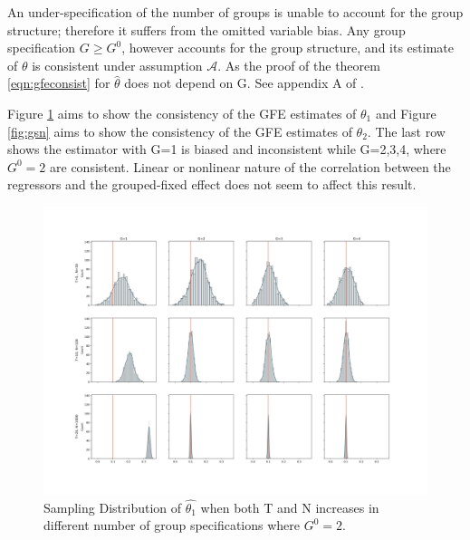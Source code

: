 An under-specification of the number of groups is unable to account for the group structure; therefore it suffers from the omitted variable bias. Any group specification $G \geq G^0$, however accounts for the group structure, and its estimate of $\theta$ is consistent under assumption $\mathcal{A}$. As the proof of the theorem \ref{eqn:gfeconsist} for $\hat{\theta}$ does not depend on G. See appendix A of \textcite{bonhomme2015grouped}.

Figure \ref{fig:gs} aims to show the consistency of the GFE estimates of $\theta_1$ and Figure \ref{fig:gsn} aims to show the consistency of the GFE estimates of $\theta_2$.
The last row shows the estimator with G=1 is biased and inconsistent while G=2,3,4, where $G^0=2$ are consistent.
Linear or nonlinear nature of the correlation between the regressors and the grouped-fixed effect does not seem to affect this result.


\begin{figure}[p]
\begin{flushleft}
\includegraphics[scale=0.31]{figures/groupssamplingplot1.png}
\end{flushleft}
\caption{Sampling Distribution of $\hat{\theta_1}$ when both T and N increases in different number of group specifications where $G^0 = 2$.}
\label{fig:gs}
\end{figure}

